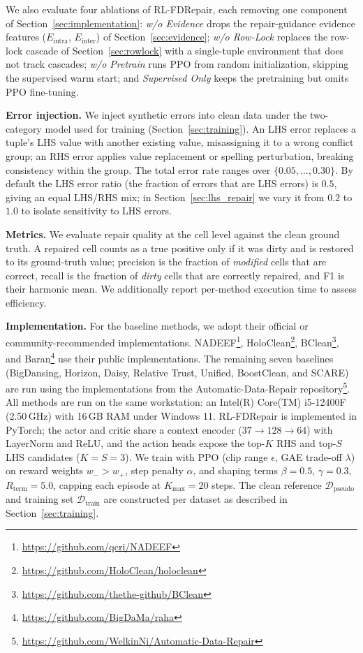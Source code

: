 \documentclass[sigconf]{acmart}
\begin{document}
We also evaluate four ablations of RL-FDRepair, each removing one component of Section~\ref{sec:implementation}: \emph{w/o Evidence} drops the repair-guidance evidence features ($E_{\text{intra}}$, $E_{\text{inter}}$) of Section~\ref{sec:evidence}; \emph{w/o Row-Lock} replaces the row-lock cascade of Section~\ref{sec:rowlock} with a single-tuple environment that does not track cascades; \emph{w/o Pretrain} runs PPO from random initialization, skipping the supervised warm start; and \emph{Supervised Only} keeps the pretraining but omits PPO fine-tuning.

\noindent\textbf{Error injection.}
We inject synthetic errors into clean data under the two-category model used for training (Section~\ref{sec:training}). An LHS error replaces a tuple's LHS value with another existing value, misassigning it to a wrong conflict group; an RHS error applies value replacement or spelling perturbation, breaking consistency within the group. The total error rate ranges over $\{0.05, \ldots, 0.30\}$. By default the LHS error ratio (the fraction of errors that are LHS errors) is $0.5$, giving an equal LHS/RHS mix; in Section~\ref{sec:lhs_repair} we vary it from $0.2$ to $1.0$ to isolate sensitivity to LHS errors.

\noindent\textbf{Metrics.}
We evaluate repair quality at the cell level against the clean ground truth. A repaired cell counts as a true positive only if it was dirty and is restored to its ground-truth value; precision is the fraction of \emph{modified} cells that are correct, recall is the fraction of \emph{dirty} cells that are correctly repaired, and F1 is their harmonic mean. We additionally report per-method execution time to assess efficiency.

\noindent\textbf{Implementation.}
For the baseline methods, we adopt their official or community-recommended implementations. NADEEF\footnote{\url{https://github.com/qcri/NADEEF}}, HoloClean\footnote{\url{https://github.com/HoloClean/holoclean}}, BClean\footnote{\url{https://github.com/thethe-github/BClean}}, and Baran\footnote{\url{https://github.com/BigDaMa/raha}} use their public implementations. The remaining seven baselines (BigDansing, Horizon, Daisy, Relative Trust, Unified, BoostClean, and SCARE) are run using the implementations from the Automatic-Data-Repair repository\footnote{\url{https://github.com/WelkinNi/Automatic-Data-Repair}}. All methods are run on the same workstation: an Intel(R) Core(TM) i5-12400F (2.50\,GHz) with 16\,GB RAM under Windows 11. RL-FDRepair is implemented in PyTorch; the actor and critic share a context encoder ($37 \rightarrow 128 \rightarrow 64$) with LayerNorm and ReLU, and the action heads expose the top-$K$ RHS and top-$S$ LHS candidates ($K = S = 3$). We train with PPO (clip range $\epsilon$, GAE trade-off $\lambda$) on reward weights $w_{-} > w_{+}$, step penalty $\alpha$, and shaping terms $\beta = 0.5$, $\gamma = 0.3$, $R_{\text{term}} = 5.0$, capping each episode at $K_{\max} = 20$ steps. The clean reference $\mathcal{D}_{\text{pseudo}}$ and training set $\mathcal{D}_{\text{train}}$ are constructed per dataset as described in Section~\ref{sec:training}.
\end{document}
